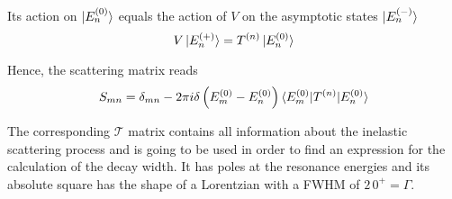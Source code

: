 Its action on $\ket{E_n^{(0)}}$ equals the action of $V$ on the asymptotic
states $\ket{E_n^{(-)}}$
\begin{equation}
 V \ket{E_n^{(+)}} = T^{(n)} \ket{E_n^{(0)}}
\end{equation}

Hence, the scattering matrix reads
\begin{equation}
 S_{mn} = \delta_{mn} - 2\pi i \delta \left(E_m^{(0)} - E_n^{(0)} \right)
          \braket{E_m^{(0)}| T^{(n)} |E_n^{(0)}}
\end{equation}

The corresponding $\mathcal{T}$ matrix contains all information about the
inelastic scattering process and is going to be used in order
to find an expression for the calculation of the decay width.
It has poles at the resonance energies and its absolute square has the
shape of a Lorentzian with a \ac{FWHM} of $2\,0^+ = \Gamma$.


